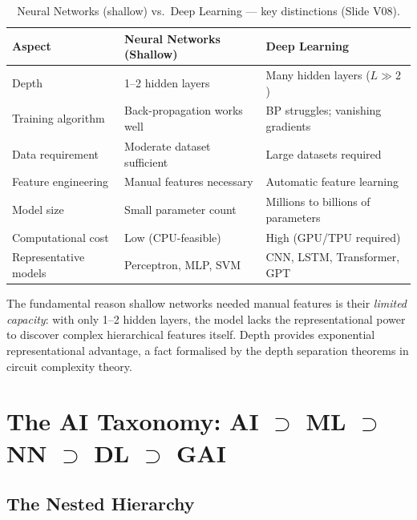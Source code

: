 \documentclass[12pt,a4paper]{article}
\begin{document}
\begin{table}[ht]
\centering
\caption{Neural Networks (shallow) vs.\ Deep Learning --- key distinctions (Slide V08).}
\label{tab:nn_vs_dl}
\begin{tabularx}{\textwidth}{lXX}
\toprule
\textbf{Aspect} & \textbf{Neural Networks (Shallow)} & \textbf{Deep Learning} \\
\midrule
Depth & 1--2 hidden layers & Many hidden layers ($L \gg 2$) \\
\addlinespace
Training algorithm & Back-propagation works well & BP struggles; vanishing gradients \\
\addlinespace
Data requirement & Moderate dataset sufficient & Large datasets required \\
\addlinespace
Feature engineering & Manual features necessary & Automatic feature learning \\
\addlinespace
Model size & Small parameter count & Millions to billions of parameters \\
\addlinespace
Computational cost & Low (CPU-feasible) & High (GPU/TPU required) \\
\addlinespace
Representative models & Perceptron, MLP, SVM & CNN, LSTM, Transformer, GPT \\
\bottomrule
\end{tabularx}
\end{table}

\begin{keyinsight}
The fundamental reason shallow networks needed manual features is their
\emph{limited capacity}: with only 1--2 hidden layers, the model lacks the
representational power to discover complex hierarchical features itself.
Depth provides exponential representational advantage, a fact formalised
by the depth separation theorems in circuit complexity theory.
\end{keyinsight}

\section{The AI Taxonomy: AI $\supset$ ML $\supset$ NN $\supset$ DL $\supset$ GAI}
\label{sec:taxonomy}

\subsection{The Nested Hierarchy}
\label{subsec:nested}
\end{document}
